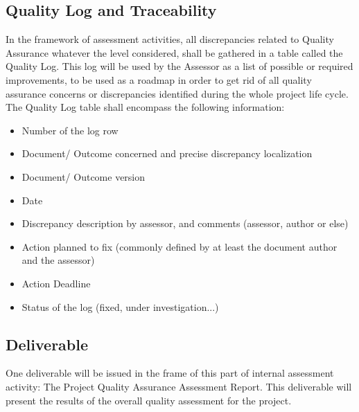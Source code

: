 \documentclass[openetcs]{template/openetcs_article}
\begin{document}
\subsection{Quality Log and Traceability}
In the framework of assessment activities, all discrepancies related to Quality Assurance whatever the level considered, shall be gathered in a table called the
Quality Log. This log will be used by the Assessor as a list of possible or required improvements, to be used as a roadmap in order to get rid of all quality
assurance concerns or discrepancies identified during the whole project life cycle.
The Quality Log table shall encompass the following information: 
\begin{itemize}
\item Number of the log row
\item Document/ Outcome concerned and precise discrepancy localization
\item Document/ Outcome version
\item Date
\item Discrepancy description by assessor, and comments (assessor, author or else)
\item Action planned to fix (commonly defined by at least the document author and the assessor)
\item Action Deadline
\item Status of the log (fixed, under investigation...)
\end{itemize}

\subsection{Deliverable}
One deliverable will be issued in the frame of this part of internal assessment activity: The Project Quality Assurance Assessment Report. This deliverable will present the results of the overall quality assessment for the project.
\end{document}
